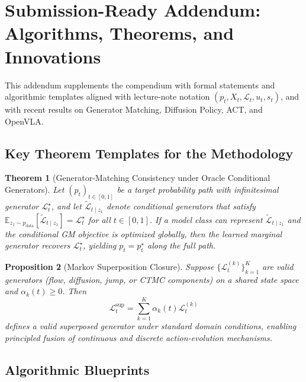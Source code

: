 \documentclass[
]{article}
\newtheorem{theorem}{Theorem}[section]
\newtheorem{proposition}[theorem]{Proposition}
\theoremstyle{remark}
\begin{document}
\section{Submission-Ready Addendum: Algorithms, Theorems, and Innovations}\label{submission-ready-addendum-algorithms-theorems-and-innovations}

This addendum supplements the compendium with formal statements and algorithmic templates aligned with lecture-note notation \((p_t, X_t, \mathcal{L}_t, u_t, s_t)\), and with recent results on Generator Matching, Diffusion Policy, ACT, and OpenVLA.

\subsection{Key Theorem Templates for the Methodology}

\begin{theorem}[Generator-Matching Consistency under Oracle Conditional Generators]
Let \((p_t)_{t\in[0,1]}\) be a target probability path with infinitesimal generator \(\mathcal{L}_t^\star\), and let
\(\widetilde{\mathcal{L}}_{t\mid z_1}\) denote conditional generators that satisfy
\(\mathbb{E}_{z_1\sim p_{\mathrm{data}}}[\widetilde{\mathcal{L}}_{t\mid z_1}] = \mathcal{L}_t^\star\)
for all \(t\in[0,1]\). If a model class can represent \(\widetilde{\mathcal{L}}_{t\mid z_1}\) and the conditional GM objective is optimized globally, then the learned marginal generator recovers \(\mathcal{L}_t^\star\), yielding \(p_t = p_t^\star\) along the full path.
\end{theorem}

\begin{proposition}[Markov Superposition Closure]
Suppose \(\{\mathcal{L}_t^{(k)}\}_{k=1}^K\) are valid generators (flow, diffusion, jump, or CTMC components) on a shared state space and \(\alpha_k(t)\ge 0\). Then
\[
\mathcal{L}_t^{\mathrm{sup}} = \sum_{k=1}^K \alpha_k(t)\mathcal{L}_t^{(k)}
\]
defines a valid superposed generator under standard domain conditions, enabling principled fusion of continuous and discrete action-evolution mechanisms.
\end{proposition}

\subsection{Algorithmic Blueprints}
\end{document}
